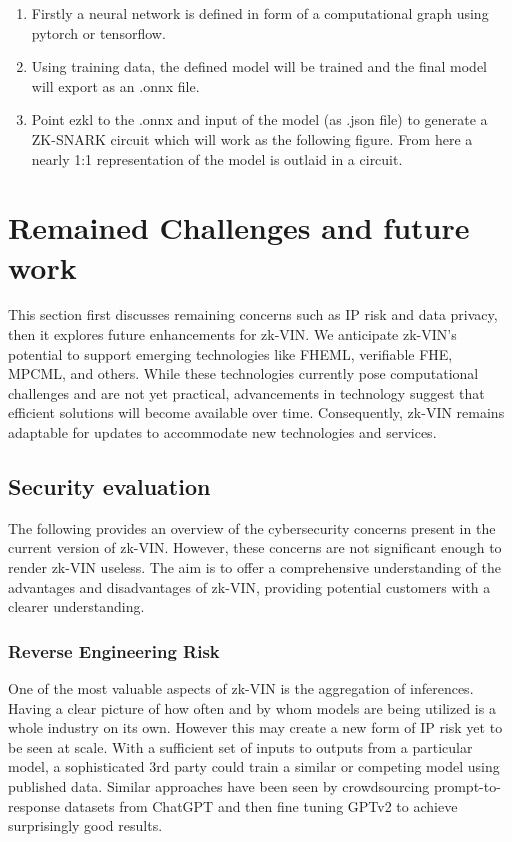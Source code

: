 \documentclass[conference]{IEEEtran}
\begin{document}
\begin{enumerate}

    \item 	Firstly a neural network is defined in form of a computational graph using pytorch or tensorflow.

    \item	Using training data, the defined model will be trained and the final model will export as an .onnx file.

    \item	Point ezkl to the .onnx and input of the model (as .json file) to generate a ZK-SNARK circuit which will work as the following figure. From here a nearly 1:1 representation of the model is outlaid in a circuit.

\end{enumerate}


\section{Remained Challenges and future work}

This section first discusses remaining concerns such as IP risk and data privacy, then it explores future enhancements for zk-VIN. We anticipate zk-VIN's potential to support emerging technologies like FHEML, verifiable FHE, MPCML, and others. While these technologies currently pose computational challenges and are not yet practical, advancements in technology suggest that efficient solutions will become available over time. Consequently, zk-VIN remains adaptable for updates to accommodate new technologies and services.

\subsection{Security evaluation}

The following provides an overview of the cybersecurity concerns present in the current version of zk-VIN. However, these concerns are not significant enough to render zk-VIN useless. The aim is to offer a comprehensive understanding of the advantages and disadvantages of zk-VIN, providing potential customers with a clearer understanding.

\subsubsection{Reverse Engineering Risk}

One of the most valuable aspects of zk-VIN is the aggregation of inferences. Having a clear picture of how often and by whom models are being utilized is a whole industry on its own. However this may create a new form of IP risk yet to be seen at scale. With a sufficient set of inputs to outputs from a particular model, a sophisticated 3rd party could train a similar or competing model using published data. Similar approaches have been seen by crowdsourcing prompt-to-response datasets from ChatGPT and then fine tuning GPTv2 to achieve surprisingly good results.
\end{document}
